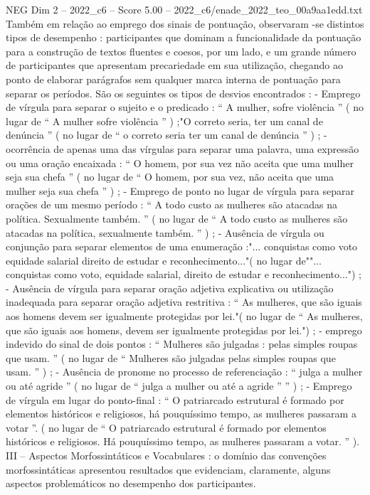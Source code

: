 \begin{textsample}{NEG Dim 2 – 2022\_c6 – Score 5.00 – 2022\_c6/enade\_2022\_teo\_00a9aa1edd.txt}
Também em relação ao emprego dos sinais de pontuação, observaram -se distintos tipos de desempenho : participantes que dominam a funcionalidade da pontuação para a construção de textos fluentes e coesos, por um lado, e um grande número de participantes que apresentam precariedade em sua utilização, chegando ao ponto de elaborar parágrafos sem qualquer marca interna de pontuação para separar os períodos.
São os seguintes os tipos de desvios encontrados : - Emprego de vírgula para separar o sujeito e o predicado : “ A mulher, sofre violência ” ( no lugar de “ A mulher sofre violência ” ) ;"O correto seria, ter um canal de denúncia ” ( no lugar de “ o correto seria ter um canal de denúncia ” ) ; - ocorrência de apenas uma das vírgulas para separar uma palavra, uma expressão ou uma oração encaixada : “ O homem, por sua vez não aceita que uma mulher seja sua chefa ” ( no lugar de “ O homem, por sua vez, não aceita que uma mulher seja sua chefa ” ) ; - Emprego de ponto no lugar de vírgula para separar orações de um mesmo período : “ A todo custo as mulheres são atacadas na política.
Sexualmente também. ” ( no lugar de “ A todo custo as mulheres são atacadas na política, sexualmente também. ” ) ; - Ausência de vírgula ou conjunção para separar elementos de uma enumeração :"... conquistas como voto equidade salarial direito de estudar e reconhecimento..."( no lugar de""... conquistas como voto, equidade salarial, direito de estudar e reconhecimento...") ; - Ausência de vírgula para separar oração adjetiva explicativa ou utilização inadequada para separar oração adjetiva restritiva : “ As mulheres, que são iguais aos homens devem ser igualmente protegidas por lei."( no lugar de “ As mulheres, que são iguais aos homens, devem ser igualmente protegidas por lei.") ; - emprego indevido do sinal de dois pontos : “ Mulheres são julgadas : pelas simples roupas que usam. ” ( no lugar de “ Mulheres são julgadas pelas simples roupas que usam. ” ) ; - Ausência de pronome no processo de referenciação : “ julga a mulher ou até agride ” ( no lugar de “ julga a mulher ou até a agride ” ” ) ; - Emprego de vírgula em lugar do ponto-final : “ O patriarcado estrutural é formado por elementos históricos e religiosos, há pouquíssimo tempo, as mulheres passaram a votar ”. ( no lugar de “ O patriarcado estrutural é formado por elementos históricos e religiosos.
Há pouquíssimo tempo, as mulheres passaram a votar. ” ).
III – Aspectos Morfossintáticos e Vocabulares : o domínio das convenções morfossintáticas apresentou resultados que evidenciam, claramente, alguns aspectos problemáticos no desempenho dos participantes.

\end{textsample}
